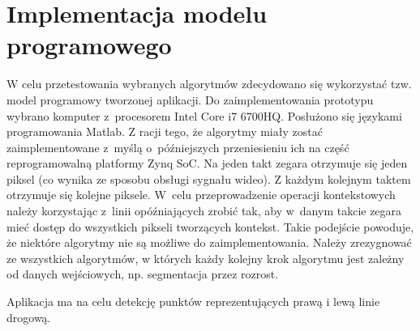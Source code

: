 \chapter{Implementacja modelu programowego}

W celu przetestowania wybranych algorytmów zdecydowano się wykorzystać tzw. model programowy tworzonej aplikacji. 
Do zaimplementowania prototypu wybrano komputer z~procesorem Intel Core i7 6700HQ. 
Posłużono się językami programowania Matlab.
Z racji tego, że algorytmy miały zostać zaimplementowane z~myślą o~późniejszych przeniesieniu ich na część reprogramowalną platformy Zynq SoC.
Na jeden takt zegara otrzymuje się jeden piksel (co wynika ze sposobu obsługi sygnału wideo).
Z każdym kolejnym taktem otrzymuje się kolejne piksele. W~celu przeprowadzenie operacji kontekstowych należy korzystając z~linii opóźniających zrobić tak, aby w~danym takcie zegara mieć dostęp do wszystkich pikseli tworzących kontekst. Takie podejście powoduje, że niektóre algorytmy nie są możliwe do zaimplementowania. Należy zrezygnować ze wszystkich algorytmów, w których każdy kolejny krok algorytmu jest zależny od danych wejściowych, np. segmentacja przez rozrost. %

Aplikacja ma na celu detekcję punktów reprezentujących prawą i lewą linie drogową. %